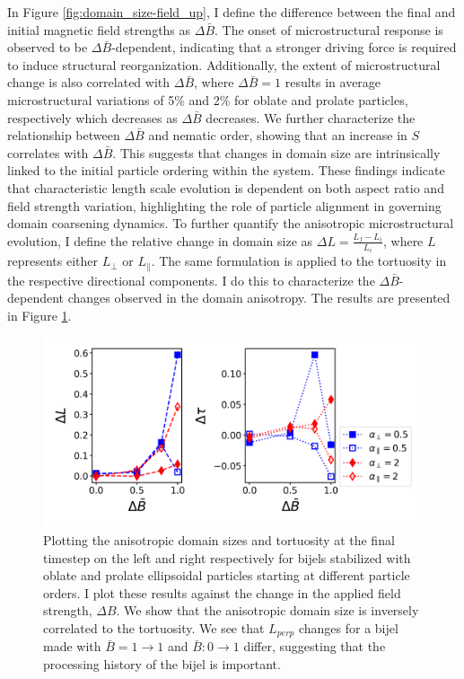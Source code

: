 In Figure \ref{fig:domain_size-field_up}, I define the difference
between the final and initial magnetic field strengths as
$\Delta \bar{B}$. The onset of microstructural response is observed to
be $\Delta \bar{B}$-dependent, indicating that a stronger driving
force is required to induce structural reorganization. Additionally, the
extent of microstructural change is also correlated with
$\Delta \bar{B}$, where $\Delta \bar{B} = 1$ results in average
microstructural variations of 5\% and 2\% for oblate and prolate
particles, respectively which decreases as $\Delta \bar{B}$ decreases.
We further characterize the relationship between $\Delta \bar{B}$ and
nematic order, showing that an increase in \(S\) correlates with
$\Delta \bar{B}$. This suggests that changes in domain size are
intrinsically linked to the initial particle ordering within the system.
These findings indicate that characteristic length scale evolution is
dependent on both aspect ratio and field strength variation,
highlighting the role of particle alignment in governing domain
coarsening dynamics. To further quantify the anisotropic microstructural
evolution, I define the relative change in domain size as
$\Delta L = \frac{L_{f} - L_{i}}{L_{i}}$, where $L$ represents
either $L_{\perp}$ or $L_{\parallel}$. The same formulation is
applied to the tortuosity in the respective directional components. I
do this to characterize the $\Delta \bar{B}$-dependent changes
observed in the domain anisotropy. The results are presented in Figure
\ref{fig:domain_size_aniso-field_up}.

\begin{figure} 
\centering 
\includegraphics[scale = 0.5]{../figures/results/paper2/domain_size_aniso-field_up.png} 
\caption{Plotting the anisotropic domain sizes and tortuosity at the final timestep on the left and right respectively for bijels stabilized with 
         oblate and prolate ellipsoidal particles starting at different particle orders. I plot these results against the change in the applied field 
         strength, $\Delta B$. We show that the anisotropic domain size is inversely correlated to the tortuosity. We see that $L_{perp}$ changes for 
         a bijel made with $\bar{B} = 1 \rightarrow 1$ and $\bar{B}: 0 \rightarrow 1$ differ, suggesting that the processing history of the bijel is important.} 
\label{fig:domain_size_aniso-field_up} 
\end{figure}

